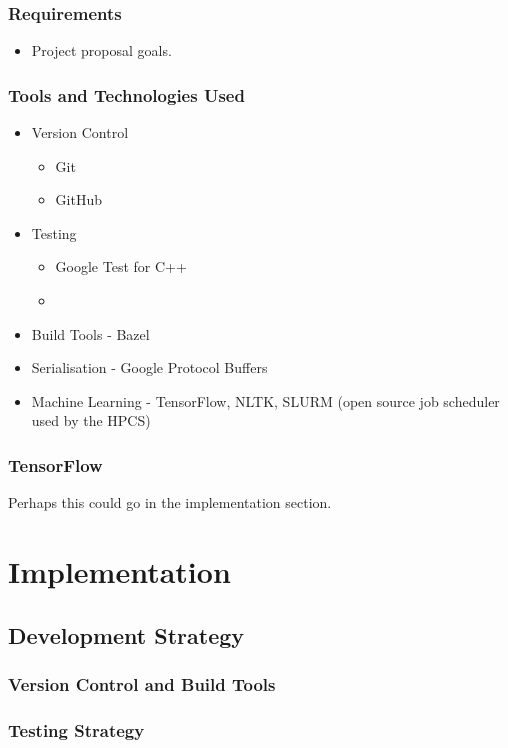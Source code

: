 \documentclass[a4paper, 12pt]{report}
\begin{document}
\subsection{Requirements}
\begin{itemize}
\item
	Project proposal goals.
\end{itemize}

\subsection{Tools and Technologies Used}
\begin{itemize}
\item
	Version Control
	\begin{itemize}
	\item
		Git
	\item
		GitHub
	\end{itemize}
\item
	Testing
	\begin{itemize}
	\item
		Google Test for C++
	\item
		
	\end{itemize}
\item
	Build Tools - Bazel
\item
	Serialisation - Google Protocol Buffers
\item
	Machine Learning - TensorFlow, NLTK, SLURM (open source job scheduler used by the HPCS)
\end{itemize}
\subsection{TensorFlow}
Perhaps this could go in the implementation section.

\chapter{Implementation}
\section{Development Strategy}
\subsection{Version Control and Build Tools}
\subsection{Testing Strategy}
\end{document}
